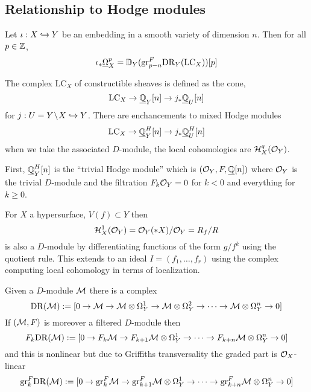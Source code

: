 \documentclass[12pt]{article}
\renewcommand{\gr}{\mathrm{gr}}
\renewcommand{\cH}{\mathcal{H}}
\begin{document}
\subsection{Relationship to Hodge modules}

\newcommand{\DR}{\mathrm{DR}}
\newcommand{\LC}{\mathrm{LC}}

\begin{prop}
Let $\iota : X \hookrightarrow Y$ be an embedding in a smooth variety of dimension $n$. Then for all $p \in \mathbb{Z}$,
\[ \iota_* \ulO_X^p = \DD_Y(\gr_{p-n}^F \DR_Y(\LC_X))[p] \]
\end{prop}

The complex $\LC_X$ of constructible sheaves is defined as the cone,
\[ \LC_X \to \ul{\Q}_Y[n] \to j_* \ul{\Q}_U[n] \]
for $j : U = Y \! \setminus \! X \hookrightarrow Y$. There are enchancements to mixed Hodge modules
\[ \LC_X \to \ul{\Q}^H_Y[n] \to j_* \ul{\Q}^H_U[n] \]
when we take the associated $D$-module, the local cohomologies are $\cH^q_X(\struct{Y})$. 

First, $\underline{\mathbb{Q}}^H_Y[n]$ is the ``trivial Hodge module'' which is $(\mathcal{O}_{Y}, F, \underline{\mathbb{Q}}[n])$ where $\mathcal{O}_{Y}$ is the trivial $D$-module and the filtration $F_k \mathcal{O}_{Y} = 0$ for $k < 0$ and everything for $k \ge 0$. 

\begin{example}
For $X$ a hypersurface, $V(f) \subset Y$ then 
\[ \cH^1_X(\struct{Y}) = \struct{Y}(* X) / \struct{Y} = R_f / R \]
is also a $D$-module by differentiating functions of the form $g/f^k$ using the quotient rule. This extends to an ideal $I = (f_1, \dots, f_r)$ using the complex computing local cohomology in terms of localization. 
\end{example}

Given a $D$-module $\mathcal{M}$ there is a complex
\[ \DR(\M) := [0 \to \M \to \M \ot \Omega^1_Y \to \M \ot \Omega^2_Y \to \cdots \to \M \ot \Omega^n_Y \to 0] \]
If $(\mathcal{M}, F)$ is moreover a filtered $D$-module then
\[ F_k \DR(\M) := [0 \to F_k \M \to F_{k+1} \M \ot \Omega_Y^1 \to \cdots \to F_{k+n} \M \ot \Omega^n_Y \to 0] \]
and this is nonlinear but due to Griffiths transversality the graded part is $\mathcal{O}_{X}$-linear
\[ \gr_k^F \DR(\M) := [0 \to \gr_k^F \M \to \gr_{k+1}^F \M \ot \Omega^1_Y \to \cdots \to \gr^F_{k+n} \M \ot \Omega_Y^n \to 0] \]
\end{document}
